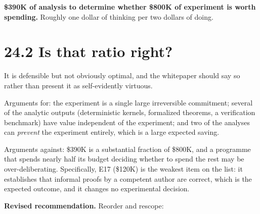 \documentclass[
  11pt]{report}
\begin{document}
\textbf{\$390K of analysis to determine whether \$800K of experiment is
worth spending.} Roughly one dollar of thinking per two dollars of
doing.

\hypertarget{is-that-ratio-right}{%
\section{24.2 Is that ratio right?}\label{is-that-ratio-right}}

It is defensible but not obviously optimal, and the whitepaper should
say so rather than present it as self-evidently virtuous.

Arguments for: the experiment is a single large irreversible commitment;
several of the analytic outputs (deterministic kernels, formalized
theorems, a verification benchmark) have value independent of the
experiment; and two of the analyses can \emph{prevent} the experiment
entirely, which is a large expected saving.

Arguments against: \$390K is a substantial fraction of \$800K, and a
programme that spends nearly half its budget deciding whether to spend
the rest may be over-deliberating. Specifically, E17 (\$120K) is the
weakest item on the list: it establishes that informal proofs by a
competent author are correct, which is the expected outcome, and it
changes no experimental decision.

\textbf{Revised recommendation.} Reorder and rescope:
\end{document}
